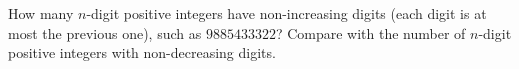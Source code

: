 How many $n$-digit positive integers have non-increasing digits (each digit is at most the previous one), such as $9885433322$? Compare with the number of $n$-digit positive integers with non-decreasing digits.
